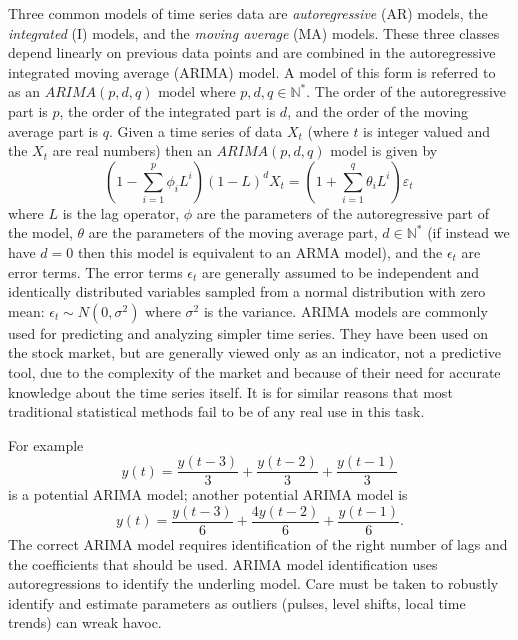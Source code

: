 Three common models of time series data are \textit{autoregressive} (AR) models, the \textit{integrated} (I) models, and the \textit{moving average} (MA) models.
These three classes depend linearly on previous data points and are combined in the autoregressive integrated moving average (ARIMA) model.
A model of this form is referred to as an $ARIMA(p,d,q)$ model where $p,d,q \in \mathbb{N^*}$.
The order of the autoregressive part is $p$, the order of the integrated part is $d$, and the order of the moving average part is $q$.
Given a time series of data $X_t$ (where $t$ is integer valued and the $X_t$ are real numbers) then an $ARIMA(p,d,q)$ model is given by
\begin{equation}
\left(1 - \sum_{i=1}^p \phi_i L^i\right) (1-L)^d X_t =
\left(1 + \sum_{i=1}^q \theta_i L^i\right) \varepsilon_t\,
\end{equation}
where $L$ is the lag operator,
$\phi$ are the parameters of the autoregressive part of the model,
$\theta$ are the parameters of the moving average part,
$d \in \mathbb{N^*}$ (if instead we have $d=0$ then this model is equivalent to an ARMA model),
and the $\epsilon_t$ are error terms.
The error terms $\epsilon_t$ are generally assumed to be independent and identically distributed variables sampled from a normal distribution with zero mean:
$\epsilon_t \sim N(0,\sigma^2)$ where $\sigma^2$ is the variance.
ARIMA models are commonly used for predicting and analyzing simpler time series.
They have been used on the stock market, but are generally viewed only as an indicator, not a predictive tool, due to the complexity of the market and because of their need for accurate knowledge about the time series itself.
It is for similar reasons that most traditional statistical methods fail to be of any real use in this task.

For example
\begin{equation}
y(t)= \frac{y(t-3)}{3} + \frac{y(t-2)}{3} + \frac{y(t-1)}{3}
\end{equation}
is a potential ARIMA model; another potential ARIMA model is
\begin{equation}
y(t)= \frac{y(t-3)}{6} + \frac{4 y(t-2)}{6} + \frac{y(t-1)}{6}.
\end{equation}
The correct ARIMA model requires identification of the right number of lags and the coefficients that should be used.  ARIMA model identification uses autoregressions to identify the underling model.  Care must be taken to robustly identify and estimate parameters as outliers (pulses, level shifts, local time trends) can wreak havoc.


